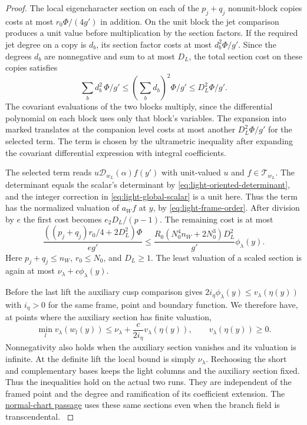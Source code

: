\begin{proof}
The local eigencharacter section on each of the \(p_j+q_j\)
nonunit-block copies costs at most \(r_0\Phi/(4g')\) in addition.
On the unit block the jet comparison produces a unit value before multiplication by the section factors. If the required jet degree on a copy
is \(d_b\), its section factor costs at most \(d_b^2\Phi/g'\).
Since the degrees \(d_b\) are nonnegative and sum to at most \(D_L\),
the total section cost on these copies satisfies
\[
 \sum_b d_b^2\,\Phi/g'\le\left(\sum_b d_b\right)^2\Phi/g'
                         \le D_L^2\Phi/g'.
\] The covariant evaluations of
the two blocks multiply, since the differential polynomial on
each block uses only that block's variables. The expansion into
marked translates at the companion level costs at most another
\(D_L^2\Phi/g'\) for the selected term. The term is chosen by
the ultrametric inequality after expanding the covariant differential expression with integral coefficients.

The selected term reads \(u\mathcal D_{w_L}(\alpha)f(y')\) with unit-valued \(u\) and
\(f\in\mathcal T_{w_L}\). The determinant equals the scalar's
determinant by \eqref{eq:light-oriented-determinant}, and
the integer correction in \eqref{eq:light-global-scalar}
is a unit here. Thus the term has the normalized valuation
of \(a_W f\) at \(y\), by \eqref{eq:light-frame-order}.
After division by \(e\) the first cost becomes
\(e_2D_L/(p-1)\). The remaining cost is at most
\[
       \frac{((p_j+q_j)r_0/4+2D_L^2)\Phi}{e g'}
       \le \frac{R_0(N_0^4n_W+2N_0^3)D_L^2}{g'}
                         \phi_\lambda(y).
\]
Here \(p_j+q_j\le n_W\), \(r_0\le N_0\), and \(D_L\ge1\).
The least valuation of a scaled section is again at most
\(\nu_\lambda+c\phi_\lambda(y)\).
\label{cor:slice-finite-depth-6}

Before the last lift the auxiliary cusp comparison gives
\(2i_\eta\phi_\lambda(y)\le v_\lambda(\eta(y))\)
with \(i_\eta>0\) for the same frame, point and boundary
function. We therefore have, at points where the auxiliary section has finite valuation,
\begin{equation}\label{eq:slice-tied-depth}
 \min_l v_\lambda(w_l(y))\le
 \nu_\lambda+\frac{c}{2i_\eta}v_\lambda(\eta(y)),
 \qquad v_\lambda(\eta(y))\ge0 .
\end{equation}
Nonnegativity also holds when the auxiliary section vanishes and its valuation is infinite. At the definite lift the local
bound is simply \(\nu_\lambda\). Rechoosing the short and
complementary bases keeps the light columns and the
auxiliary section fixed. Thus the inequalities hold on
the actual two runs. They are independent of the
framed point and the degree and ramification of its
coefficient extension. The \hyperref[par:slice-valued-orders]{normal-chart passage} uses these same
sections even when the branch field is transcendental.
\label{cor:slice-finite-depth-7}
\end{proof}
